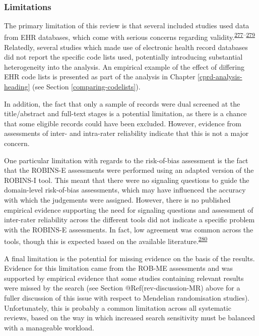 \documentclass[a4paper, twoside]{templates/ociamthesis}
\begin{document}
~

\hypertarget{limitations}{%
\subsubsection{Limitations}\label{limitations}}

The primary limitation of this review is that several included studies used data from EHR databases, which come with serious concerns regarding validity.\textsuperscript{\protect\hyperlink{ref-hsieh2019}{277}--\protect\hyperlink{ref-wilkinson2018}{279}} Relatedly, several studies which made use of electronic health record databases did not report the specific code lists used, potentially introducing substantial heterogeneity into the analysis. An empirical example of the effect of differing EHR code lists is presented as part of the analysis in Chapter \ref{cprd-analysis-heading} (see Section \ref{comparing-codelists}).

In addition, the fact that only a sample of records were dual screened at the title/abstract and full-text stages is a potential limitation, as there is a chance that some eligible records could have been excluded. However, evidence from assessments of inter- and intra-rater reliability indicate that this is not a major concern.

One particular limitation with regards to the risk-of-bias assessment is the fact that the ROBINS-E assessments were performed using an adapted version of the ROBINS-I tool. This meant that there were no signaling questions to guide the domain-level risk-of-bias assessments, which may have influenced the accuracy with which the judgements were assigned. However, there is no published empirical evidence supporting the need for signaling questions and assessment of inter-rater reliability across the different tools did not indicate a specific problem with the ROBINS-E assessments. In fact, low agreement was common across the tools, though this is expected based on the available literature.\textsuperscript{\protect\hyperlink{ref-jeyaraman2020}{280}}

A final limitation is the potential for missing evidence on the basis of the results. Evidence for this limitation came from the ROB-ME assessments and was supported by empirical evidence that some studies containing relevant results were missed by the search (see Section @Ref(rev-discussion-MR) above for a fuller discussion of this issue with respect to Mendelian randomisation studies). Unfortunately, this is probably a common limitation across all systematic reviews, based on the way in which increased search sensitivity must be balanced with a manageable workload.
\end{document}
